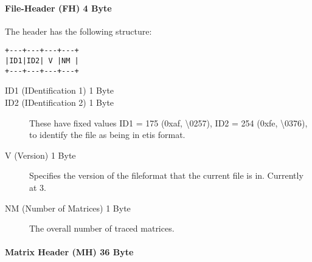 \paragraph{File-Header (FH) 4 Byte}

The header has the following structure:
\begin{verbatim}
+---+---+---+---+
|ID1|ID2| V |NM |
+---+---+---+---+
\end{verbatim}
\begin{description}
\item[ID1 (IDentification 1) 1 Byte]
\item[ID2 (IDentification 2) 1 Byte]
These have fixed values ID1 = 175 (0xaf, \textbackslash0257), ID2 = 254 (0xfe, \textbackslash0376), to identify 
the file as being in etis format.
\item[V (Version) 1 Byte]
Specifies the version of the fileformat that the current file is in. Currently at 3.
\item[NM (Number of Matrices) 1 Byte]
The overall number of traced matrices.
\end{description}

\paragraph{Matrix Header (MH) 36 Byte}

